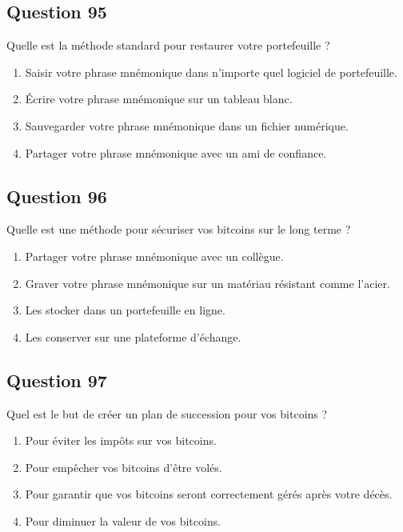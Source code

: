 \documentclass[12pt,a4paper]{article}
\begin{document}
\bigskip


\subsection*{Question 95}
Quelle est la méthode standard pour restaurer votre portefeuille ?

\begin{enumerate}[label=\Alph*., leftmargin=*]
\item Saisir votre phrase mnémonique dans n'importe quel logiciel de portefeuille.
\item Écrire votre phrase mnémonique sur un tableau blanc.
\item Sauvegarder votre phrase mnémonique dans un fichier numérique.
\item Partager votre phrase mnémonique avec un ami de confiance.
\end{enumerate}

\bigskip


\subsection*{Question 96}
Quelle est une méthode pour sécuriser vos bitcoins sur le long terme ?

\begin{enumerate}[label=\Alph*., leftmargin=*]
\item Partager votre phrase mnémonique avec un collègue.
\item Graver votre phrase mnémonique sur un matériau résistant comme l'acier.
\item Les stocker dans un portefeuille en ligne.
\item Les conserver sur une plateforme d'échange.
\end{enumerate}

\bigskip


\subsection*{Question 97}
Quel est le but de créer un plan de succession pour vos bitcoins ?

\begin{enumerate}[label=\Alph*., leftmargin=*]
\item Pour éviter les impôts sur vos bitcoins.
\item Pour empêcher vos bitcoins d'être volés.
\item Pour garantir que vos bitcoins seront correctement gérés après votre décès.
\item Pour diminuer la valeur de vos bitcoins.
\end{enumerate}
\end{document}
